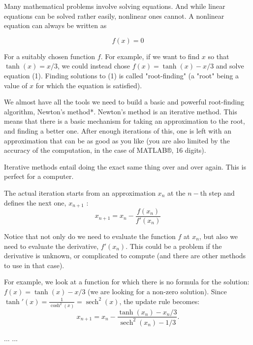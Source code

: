 \documentclass[a4paper,12pt]{article}
\DeclareMathOperator{\sech}{sech}
\begin{document}
Many mathematical problems involve solving equations. And while linear equations can be solved rather easily, nonlinear ones cannot. A nonlinear equation can always be written as

\begin{equation} \label{eq:non-linear:function} f(x)=0 \end{equation}


For a suitably chosen function \(f\). For example, if we want to find \(x\) so that \(\tanh(x)=x/3\), we could instead chose \(f(x)=\tanh(x)-x/3\) and solve equation (1). Finding solutions to (1) is called "root-finding" (a "root" being a value of \(x\) for which the equation is satisfied).

We almost have all the tools we need to build a basic and powerful root-finding algorithm, Newton's method*. Newton's method is an iterative method. This means that there is a basic mechanism for taking an approximation to the root, and finding a better one. After enough iterations of this, one is left with an approximation that can be as good as you like (you are also limited by the accuracy of the computation, in the case of MATLAB®, 16 digits).

Iterative methods entail doing the exact same thing over and over again. This is perfect for a computer.

The actual iteration starts from an approximation \(x_n\) at the \(n-\)th step and defines the next one, \(x_{n+1}\) : \begin{equation} \label{eq:2} x_{n+1}=x_n-\frac{f(x_n)}{f'(x_n)} \end{equation}

Notice that not only do we need to evaluate the function \(f\) at \(x_n\), but also we need to evaluate the derivative, \(f'(x_n)\). This could be a problem if the derivative is unknown, or complicated to compute (and there are other methods to use in that case).

For example, we look at a function for which there is no formula for the solution: \(f(x)=\tanh(x) - x/3\) (we are looking for a non-zero solution). Since \(\tanh'(x)=\frac{1}{\cosh^2(x)}=\sech^2(x)\), the update rule becomes: \begin{equation} \label{eq:3} x_{n+1}=x_n-\frac{\tanh(x_n)-x_n/3}{\sech^2(x_n)-1/3}. \end{equation}



... ...
\end{document}
